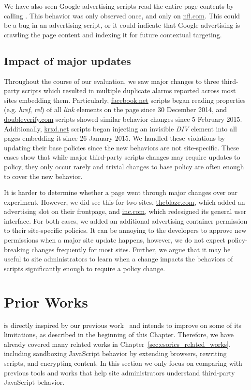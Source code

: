 We have also seen Google advertising scripts read the entire page
contents by calling .  This behavior was
only observed once, and only on \url{nfl.com}.  This could be a bug in
an advertising script, or it could indicate that Google advertising is
crawling the page content and indexing it for future contextual
targeting. 

\subsection{Impact of major updates}\label{sec:majorUpdate}

Throughout the course of our evaluation, we saw major changes to three
third-party scripts which resulted in multiple duplicate alarms reported
across most sites embedding them.  Particularly, \url{facebook.net}
scripts began reading properties (e.g. \emph{href}, \emph{rel}) of all
\emph{link} elements on the page since 30 December 2014, and
\url{doubleverify.com} scripts showed similar behavior changes since 5
February 2015.  Additionally, \url{krxd.net} scripts began injecting an
invisible \emph{DIV} element into all pages embedding it since 26
January 2015.  We handled these violations by updating their base
policies since the new behaviors are not site-specific.  These cases
show that while major third-party scripts changes may require updates to
policy, they only occur rarely and trivial changes to base policy are
often enough to cover the new behavior.

It is harder to determine whether a page went through major changes over
our experiment.  However, we did see this for two sites,
\url{theblaze.com}, which added an advertising slot on their frontpage,
and \url{inc.com}, which redesigned its general user interface.  For
both cases, we added an additional advertising container permission to
their site-specific policies.  It can be annoying to the developers to
approve new permissions when a major site update happens, however, we do
not expect policy-breaking changes frequently for most sites.  Further,
we argue that it may be useful to site administrators to learn when a
change impacts the behaviors of scripts significantly enough to require
a policy change.

\section{Prior Works}\label{sec:stRelatedWorks}

\st is directly inspired by our previous work~\cite{Zhou-ESORICS} and intends to improve on some of its limitations, as described in the beginning of this Chapter.  Therefore, we have already covered many related works in Chapter~\ref{sec:esorics_related_works}, including sandboxing JavaScript behavior by extending browsers, rewriting scripts, and encrypting content.  In this section we only focus on comparing \st with previous tools and works that help site administrators understand third-party JavaScript behavior.

